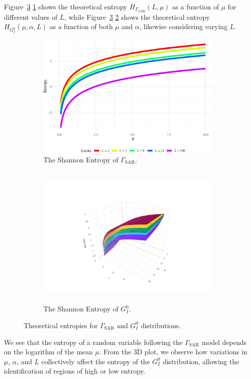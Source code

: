 Figure~\ref{fig:all_H} \ref{fig:H1} shows the theoretical entropy $H_{\Gamma_{\text{SAR}}}(L, \mu)$ as a function of $\mu$ for different values of $L$, while Figure~\ref{fig:all_H} \ref{fig:H2} shows the theoretical entropy $H_{G_I^0}(\mu, \alpha, L)$ as a function of both $\mu$ and $\alpha$, likewise considering varying $L$. 
\begin{figure}[htb]
  \centering
  \begin{subfigure}[b]{0.35\textwidth}
    \centering
    \includegraphics[width=1.5\textwidth]{../../Figures/PDF/PlotGammaSAR-1}
    \caption{The Shannon Entropy of $\Gamma_{\text{SAR}}$.}
    \label{fig:H1}
  \end{subfigure}
  \hfill
  \begin{subfigure}[b]{0.6\textwidth}
    \centering
    \includegraphics[width=12cm, height=7cm]{../../Figures/PDF/3d_lab}
    \caption{The Shannon Entropy of $G_I^0$.}
    \label{fig:H2}
  \end{subfigure}
  \caption{Theoretical entropies for $\Gamma_{\text{SAR}}$ and $G_I^0$ distributions.}
  \label{fig:all_H}
\end{figure}
We see that the entropy of a random variable following the $\Gamma_{\text{SAR}}$ model depends on the logarithm of the mean $\mu$.  
From the 3D plot, we observe how variations in $\mu$, $\alpha$, and $L$ collectively affect the entropy of the $G_I^0$ distribution, allowing  the identification of regions of high or low entropy.

